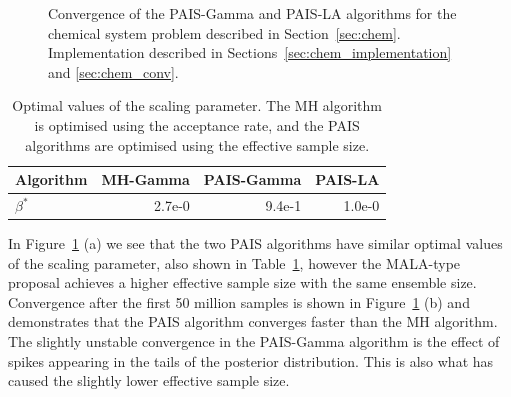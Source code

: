 \documentclass[final]{siamltex}
\begin{document}
\begin{figure}[htb]
\centering
{}
\caption{Convergence of the PAIS-Gamma and PAIS-LA algorithms for the chemical system problem described in Section~\ref{sec:chem}. Implementation described in Sections~\ref{sec:chem_implementation} and \ref{sec:chem_conv}.}
\label{fig:C1_ESS}
\end{figure}

\begin{table}[!htb]
      \centering
        \begin{tabular}{|l|r|r|r|}
	\hline
	Algorithm	& MH-Gamma & PAIS-Gamma & PAIS-LA \\ \hline
	$\beta^*$	& 2.7e-0     & 9.4e-1    & 1.0e-0 \\
	\hline
	\end{tabular}
	\vspace{1mm}
	\caption{Optimal values of the scaling parameter. The MH algorithm is optimised using the acceptance rate, and the PAIS algorithms are optimised using the effective sample size.}
	\label{table:C1_opt_beta}
\end{table}

In Figure~\ref{fig:C1_ESS} (a) we see that the two PAIS algorithms have similar optimal values of the scaling parameter, also shown in Table~\ref{table:C1_opt_beta}, however the MALA-type proposal achieves a higher effective sample size with the same ensemble size. Convergence after the first 50 million samples is shown in Figure~\ref{fig:C1_ESS} (b) and demonstrates that the PAIS algorithm converges faster than the MH algorithm. The slightly unstable convergence in the PAIS-Gamma algorithm is the effect of spikes appearing in the tails of the posterior distribution. This is also what has caused the slightly lower effective sample size.
\end{document}
